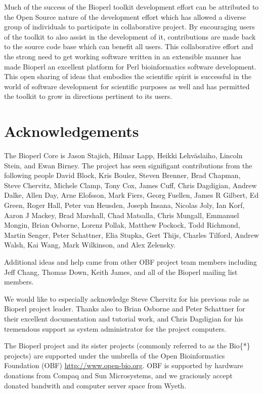 \documentclass[12pt]{article}
\begin{document}
Much of the success of the Bioperl toolkit development effort can be
attributed to the Open Source nature of the development effort which
has allowed a diverse group of individuals to participate in
collaborative project.  By encouraging users of the toolkit to also
assist in the development of it, contributions are made back to the
source code base which can benefit all users.  This collaborative
effort and the strong need to get working software written in
an extensible manner has made Bioperl an excellent platform for Perl
bioinformatics software development.  This open sharing of ideas that
embodies the scientific spirit is successful in the world of software
development for scientific purposes as well and has permitted the
toolkit to grow in directions pertinent to its users.

\section{Acknowledgements}

The Bioperl Core is Jason Stajich, Hilmar Lapp, Heikki Lehv\"{a}slaiho,
Lincoln Stein, and Ewan Birney.  The project has seen signifigant
contributions from the following people David Block, Kris Boulez,
Steven Brenner, Brad Chapman, Steve Chervitz, Michele Clamp, Tony Cox,
James Cuff, Chris Dagdigian, Andrew Dalke, Allen Day, Arne Elofsson,
Mark Fiers, Georg Fuellen, James R Gilbert, Ed Green, Roger Hall,
Peter van Heusden, Joseph Insana, Nicolas Joly, Ian Korf, Aaron J
Mackey, Brad Marshall, Chad Matsalla, Chris Mungall, Emmanuel Mongin,
Brian Osborne, Lorenz Pollak, Matthew Pockock, Todd Richmond, Martin
Senger, Peter Schattner, Elia Stupka, Gert Thijs, Charles Tilford,
Andrew Walsh, Kai Wang, Mark Wilkinson, and Alex Zelensky.

Additional ideas and help came from other OBF project team members
including Jeff Chang, Thomas Down, Keith James, and all of the Bioperl
mailing list members.

We would like to especially acknowledge Steve Chervitz for his
previous role as Bioperl project leader.  Thanks also to Brian Osborne
and Peter Schattner for their excellent documentation and tutorial
work, and Chris Dagdigian for his tremendous support as system
administrator for the project computers.

The Bioperl project and its sister projects (commonly referred to as
the Bio\{*\} projects) are supported under the umbrella of the Open
Bioinformatics Foundation (OBF) \url{http://www.open-bio.org}.
OBF is supported by hardware donations from Compaq and Sun
Microsystems, and we graciously accept donated bandwith and computer
server space from Wyeth.
\end{document}
